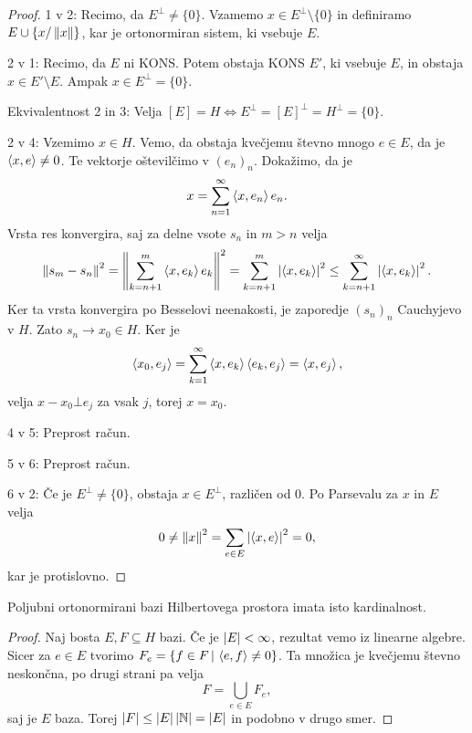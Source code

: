 \begin{proof}
  1 v 2:
  Recimo, da $E^\bot \ne \{0\}$.
  Vzamemo $x \in E^\bot \setminus \{0\}$ in definiramo $E \cup \{x /
  \left\lVert x\right\rVert\}$, kar je ortonormiran sistem, ki vsebuje $E$.
  \protislovje{}

  2 v 1:
  Recimo, da $E$ ni KONS\@.
  Potem obstaja KONS $E'$, ki vsebuje $E$, in obstaja $x \in E' \setminus E$.
  Ampak $x \in E^\bot = \{0\}$.
  \protislovje{}

  Ekvivalentnost 2 in 3:
  Velja $[E] = H \iff E^\bot = [E]^\bot = H^\bot = \{0\}$.

  2 v 4:
  Vzemimo $x \in H$.
  Vemo, da obstaja kvečjemu števno mnogo $e \in E$, da je $\left< x,e \right> \ne 0$.
  Te vektorje oštevilčimo v $(e_n)_n$.
  Dokažimo, da je
  \[
	x = \sum_{n=1}^\infty \left< x, e_n \right> e_n.
  \]
  Vrsta res konvergira, saj za delne vsote $s_n$ in $m > n$ velja
  \[
	\left\lVert s_m - s_n\right\rVert^2 = \left\lVert\sum_{k=n+1}^m \left< x, e_k \right> e_k\right\rVert^2
	= \sum_{k=n+1}^m \left| \left< x, e_k \right> \right|^2
	\le \sum_{k=n+1}^\infty \left| \left< x, e_k \right> \right|^2.
  \]
  Ker ta vrsta konvergira po Besselovi neenakosti, je zaporedje $(s_n)_n$
  Cauchyjevo v $H$.
  Zato $s_n \to x_0 \in H$.
  Ker je
  \[
	\left< x_0, e_j \right> = \sum_{k=1}^\infty \left< x, e_k \right> \left< e_k, e_j \right> = \left< x, e_j \right>,
  \]
  velja $x - x_0 \bot e_j$ za vsak $j$, torej $x = x_0$.

  4 v 5:
  Preprost račun.

  5 v 6:
  Preprost račun.

  6 v 2:
  Če je $E^\bot \ne \{0\}$, obstaja $x \in E^\bot$, različen od $0$.
  Po Parsevalu za $x$ in $E$ velja
  \[
	0 \ne \left\lVert x\right\rVert^2 = \sum_{e \in E} \left| \left< x, e \right> \right|^2 = 0,
  \]
  kar je protislovno.
  \protislovje{}
\end{proof}


\begin{trditev}
  Poljubni ortonormirani bazi Hilbertovega prostora imata isto kardinalnost.
\end{trditev}

\begin{proof}
  Naj bosta $E, F \subseteq H$ bazi.
  Če je $\left| E \right| < \infty$, rezultat vemo iz linearne algebre.
  Sicer za $e \in E$ tvorimo $F_e = \{f \in F \,|\, \left< e,f \right> \ne 0\}$.
  Ta množica je kvečjemu števno neskončna, po drugi strani pa velja
  \[
	F = \bigcup_{e \in E} F_e,
  \]
  saj je $E$ baza.
  Torej $\left| F \right| \le \left| E \right| \left| \mathbb{N} \right| = \left| E \right|$ in podobno v drugo smer.
\end{proof}

